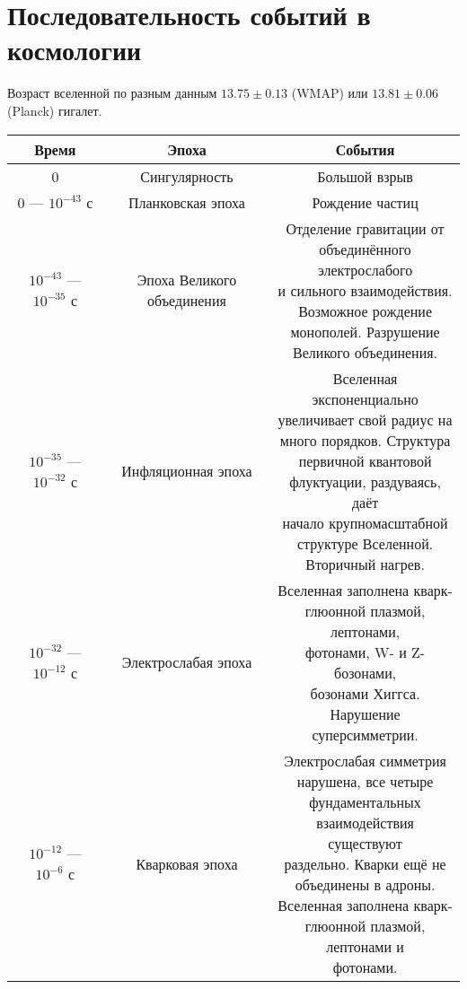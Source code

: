 \documentclass{article}
\makeatletter
\newcommand{\specialcell}[2][c]{%
  \begin{tabular}[#1]{@{}c@{}}#2\end{tabular}}
\makeatother
\begin{document}
\section{Последовательность событий в космологии}
Возраст вселенной по разным данным $13.75 \pm 0.13$ (WMAP) или $13.81 \pm 0.06$ (Planck) гигалет.
\begin{center}
\begin{longtable}{|c|c|c|}
\hline
 Время& Эпоха& События\\
\hline
 0& Сингулярность& Большой взрыв\\
\hline
 0 — $10^{-43}$ с& Планковская эпоха& Рождение частиц\\
\hline
 $10^{-43}$ — $10^{-35}$ с & Эпоха Великого объединения& \specialcell{Отделение гравитации от\\ объединённого электрослабого\\ и сильного взаимодействия.\\ Возможное рождение\\ монополей. Разрушение\\ Великого объединения.} \\
\hline
 $10^{-35}$ — $10^{-32}$ с& Инфляционная эпоха& \specialcell{Вселенная экспоненциально\\ увеличивает свой радиус на\\ много порядков. Структура\\ первичной квантовой\\ флуктуации, раздуваясь, даёт\\ начало крупномасштабной\\ структуре Вселенной.\\ Вторичный нагрев.} \\
\hline
 $10^{-32}$ — $10^{-12}$ с& Электрослабая эпоха& \specialcell{Вселенная заполнена кварк-\\глюонной плазмой, лептонами,\\ фотонами, W- и Z-бозонами,\\ бозонами Хиггса. Нарушение\\ суперсимметрии.} \\
\hline
 $10^{-12}$ — $10^{-6}$ с& Кварковая эпоха& \specialcell{Электрослабая симметрия\\ нарушена, все четыре\\ фундаментальных\\ взаимодействия существуют\\ раздельно. Кварки ещё не\\ объединены в адроны.\\ Вселенная заполнена кварк-\\глюонной плазмой, лептонами и\\ фотонами.} \\

\end{longtable}
\end{center}
\end{document}
